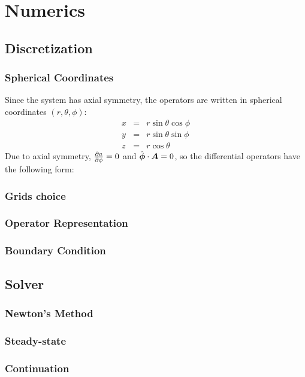 \section{Numerics}
\subsection{Discretization}
\subsubsection{Spherical Coordinates}
Since the system has axial symmetry, the operators are written in 
spherical coordinates $(r,\theta,\phi)$:
\begin{eqnarray}
x &=& r \sin \theta \cos \phi \\
y &=& r \sin \theta \sin \phi \\
z &=& r \cos \theta
\end{eqnarray}
Due to axial symmetry, $\frac{\partial a}{\partial \phi} = 0$ and $\hat{\boldsymbol{\phi}} \cdot \boldsymbol{A} = 0$, 
so the differential operators have the following form:
\subsubsection{Grids choice}
\subsubsection{Operator Representation}
\subsubsection{Boundary Condition}
\subsection{Solver}
\subsubsection{Newton's Method}
\subsubsection{Steady-state}
\subsubsection{Continuation}
